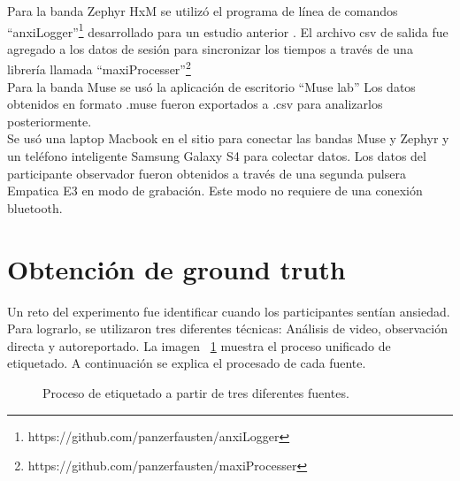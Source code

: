 Para la banda Zephyr HxM se utiliz\'o el programa de l\'inea de comandos ``anxiLogger''\footnote{https://github.com/panzerfausten/anxiLogger} desarrollado para un estudio anterior \citep{Miranda}. El archivo csv de salida fue agregado a los datos de sesi\'on para sincronizar los tiempos a trav\'es de una librer\'ia llamada ``maxiProcesser''\footnote{https://github.com/panzerfausten/maxiProcesser}
\\
Para la banda Muse se us\'o la aplicaci\'on de escritorio ``Muse lab'' Los datos obtenidos en formato .muse fueron exportados a .csv para analizarlos posteriormente.
\\
Se us\'o una laptop Macbook en el sitio para conectar las bandas Muse y Zephyr y un tel\'efono inteligente Samsung Galaxy S4 para colectar datos. Los datos del participante observador fueron obtenidos a trav\'es de una segunda pulsera Empatica E3 en modo de grabaci\'on. Este modo no requiere de una conexi\'on bluetooth.

\section{Obtenci\'on de ground truth}\label{secc:dataanalysis}
Un reto del experimento fue identificar cuando los participantes sent\'ian ansiedad. Para lograrlo, se utilizaron tres diferentes t\'ecnicas: An\'alisis de video, observaci\'on directa y autoreportado. La imagen ~\ref{fig:labeling} muestra el proceso unificado de etiquetado. A continuaci\'on se explica el procesado de cada fuente.

\begin{figure}[h]
        \centering
	\caption{Proceso de etiquetado a partir de tres diferentes fuentes.}\label{fig:labeling}
\end{figure}
